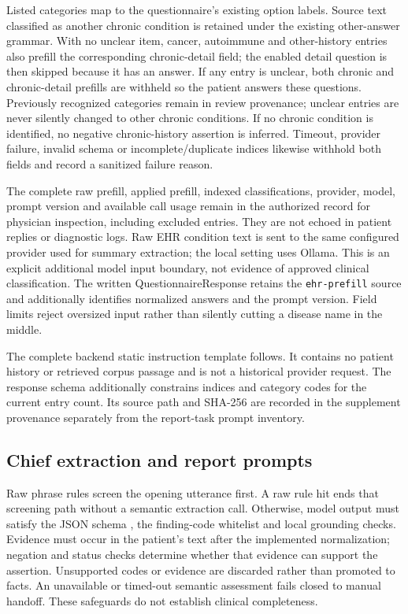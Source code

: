 Listed categories map to the questionnaire's existing option labels. Source
text classified as another chronic condition is retained under the existing
other-answer grammar. With no unclear item, cancer, autoimmune and other-history
entries also prefill the corresponding chronic-detail field; the enabled detail
question is then skipped because it has an answer. If any entry is unclear,
both chronic and chronic-detail prefills are withheld so the patient answers
these questions. Previously recognized categories remain in review provenance;
unclear entries are never silently changed to other chronic conditions. If no
chronic condition is identified, no negative chronic-history assertion is
inferred. Timeout, provider failure, invalid schema or incomplete/duplicate
indices likewise withhold both fields and record a sanitized failure reason.

The complete raw prefill, applied prefill, indexed classifications, provider,
model, prompt version and available call usage remain in the authorized record
for physician inspection, including excluded entries. They are not echoed in
patient replies or diagnostic logs. Raw EHR condition text is sent to the same
configured provider used for summary extraction; the local setting uses Ollama.
This is an explicit additional model input boundary, not evidence of approved
clinical classification. The written QuestionnaireResponse retains the
\texttt{ehr-prefill} source and additionally identifies normalized answers and
the prompt version. Field limits reject oversized input rather than silently
cutting a disease name in the middle.

The complete backend static instruction template follows. It contains no patient
history or retrieved corpus passage and is not a historical provider request.
The response schema additionally constrains indices and category codes for the
current entry count. Its source path and SHA-256 are recorded in the supplement
provenance separately from the report-task prompt inventory.

\subsection{Chief extraction and report prompts}
Raw phrase rules screen the opening utterance first. A raw rule hit ends that
screening path without a semantic extraction call. Otherwise, model output must
satisfy the JSON schema \citep{jsonSchema}, the finding-code whitelist and local grounding checks.
Evidence must occur in the patient's text after the implemented normalization;
negation and status checks determine whether that evidence can support the
assertion. Unsupported codes or evidence are discarded rather than promoted to
facts. An unavailable or timed-out semantic assessment fails closed to manual
handoff. These safeguards do not establish clinical completeness.

